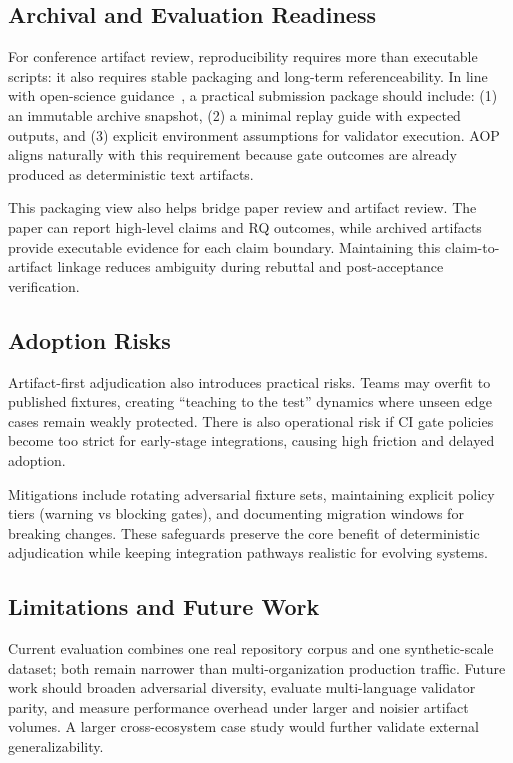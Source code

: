 \documentclass[10pt,conference]{IEEEtran}
\begin{document}
\subsection{Archival and Evaluation Readiness}

For conference artifact review, reproducibility requires more than executable
scripts: it also requires stable packaging and long-term referenceability.
In line with open-science guidance~\cite{icse_open_science_2027}, a practical
submission package should include: (1) an immutable archive snapshot, (2) a
minimal replay guide with expected outputs, and (3) explicit environment
assumptions for validator execution. AOP aligns naturally with this requirement
because gate outcomes are already produced as deterministic text artifacts.

This packaging view also helps bridge paper review and artifact review. The
paper can report high-level claims and RQ outcomes, while archived artifacts
provide executable evidence for each claim boundary. Maintaining this claim-to-
artifact linkage reduces ambiguity during rebuttal and post-acceptance
verification.

\subsection{Adoption Risks}

Artifact-first adjudication also introduces practical risks. Teams may overfit
to published fixtures, creating ``teaching to the test'' dynamics where unseen
edge cases remain weakly protected. There is also operational risk if CI gate
policies become too strict for early-stage integrations, causing high friction
and delayed adoption.

Mitigations include rotating adversarial fixture sets, maintaining explicit
policy tiers (warning vs blocking gates), and documenting migration windows for
breaking changes. These safeguards preserve the core benefit of deterministic
adjudication while keeping integration pathways realistic for evolving systems.

\subsection{Limitations and Future Work}

Current evaluation combines one real repository corpus and one synthetic-scale
dataset; both remain narrower than multi-organization production traffic.
Future work should broaden adversarial diversity, evaluate multi-language
validator parity, and measure performance overhead under larger and noisier
artifact volumes. A larger cross-ecosystem case study would further validate
external generalizability.
\end{document}
